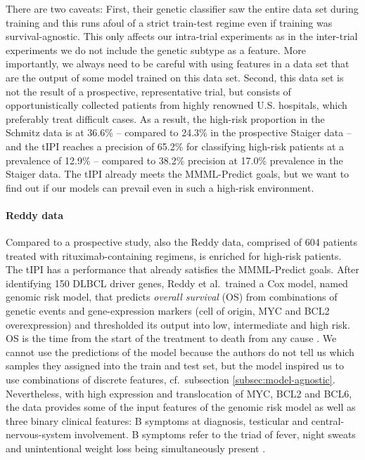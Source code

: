 There are two caveats: First, their genetic classifier saw the entire data set during training and 
this runs afoul of a strict train-test regime even if training was 
survival-agnostic. This only affects our intra-trial experiments as in the inter-trial experiments 
we do not include the genetic subtype as a feature. More importantly, we always need 
to be careful with using features in a data set that are the output of some model trained on this 
data set. Second, this data set is not the result of a 
prospective, representative trial, but consists of opportunistically collected patients from highly renowned 
U.S. hospitals, which preferably treat 
difficult cases. As a result, the high-risk proportion in the Schmitz data is at \num{36.6}\% -- 
compared to \num{24.3}\% in the prospective Staiger data -- and the tIPI reaches a precision of 
\num{65.2}\% for classifying high-risk patients at a prevalence of \num{12.9}\% -- compared to 
\num{38.2}\% precision at \num{17.0}\% prevalence in the Staiger data. The tIPI already meets the 
MMML-Predict goals, but we want to find out if our models can prevail even in such a high-risk 
environment.

\paragraph{Reddy data}

Compared to a prospective study, also the Reddy data, comprised of \num{604} patients treated with 
rituximab-containing regimens, is enriched for high-risk patients. The 
tIPI has a performance that already satisfies the MMML-Predict goals. After identifying \num{150} 
DLBCL driver genes, Reddy et al.\ trained a Cox model, named genomic risk model,
that predicts \textit{overall survival} (OS) from combinations of genetic events and gene-expression markers 
(cell of origin, MYC and BCL2 overexpression) and thresholded its output into low, intermediate and 
high risk. OS is the time from the start of the treatment to death from any cause \cite{pazdur08}. 
We cannot use the predictions of the model because the authors do not tell us which 
samples they assigned into the train and test set, but the model inspired us to use combinations of 
discrete features, cf.\ subsection 
\ref{subsec:model-agnostic}. Nevertheless, with high expression and translocation of MYC, BCL2 and 
BCL6, the data provides some of the input features of the genomic risk model as well as three binary 
clinical features: B symptoms at diagnosis, testicular and central-nervous-system involvement. B 
symptoms refer to the triad of fever, night sweats and unintentional weight 
loss being simultaneously present \cite{carbone71}.

